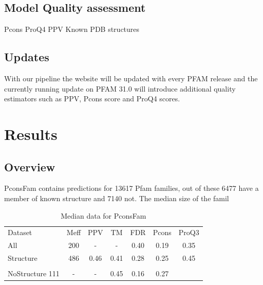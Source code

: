\documentclass[a4,center,fleqn]{NAR}
\begin{document}
\subsection{Model Quality assessment}
Pcons
ProQ4
PPV
Known PDB structures

\subsection{Updates}

With our pipeline the website will be updated with every PFAM release
and the currently running update on PFAM 31.0 will introduce
additional quality estimators such as PPV, Pcons score and ProQ4
scores. 

\section{Results}


\subsection{Overview}

PconsFam contains predictions for 13617 Pfam families, out of these
6477 have a member of known structure and  7140 not.  The median size
of the famil

\begin{table}
\begin{tabular}{lcccccc}
Dataset & Meff & PPV & TM & FDR & Pcons & ProQ3\\   
All  &  200 & - & - & 0.40 & 0.19 & 0.35\\
Structure &  486 &  0.46 & 0.41 & 0.28 & 0.25 & 0.45\\ \\
NoStructure  111 & - & - & 0.45 & 0.16 & 0.27 \\
\end{tabular}
\caption{Median data for PconsFam}
\label{tab:summary}
\end{table}

\iffalse
\end{document}
